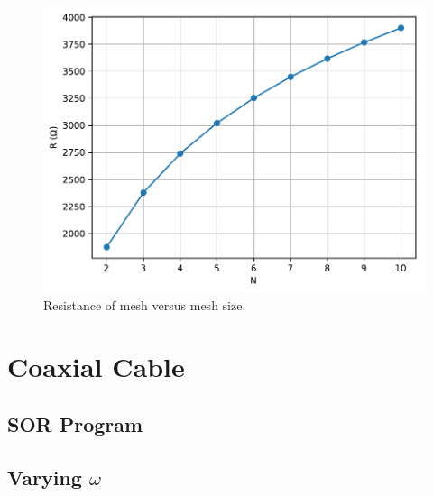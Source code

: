 \documentclass[a4paper,titlepage]{article}
\begin{document}
	\begin{figure}[!htb]
		\centering
		\includegraphics[width=\columnwidth]{plots/q2d.pdf}
		\caption
		{Resistance of mesh versus mesh size.}
		\label{fig:q2d}
	\end{figure}
	
	\section{Coaxial Cable}
	
	\subsection{SOR Program}
	
	\subsection{Varying $\omega$}
	
\end{document}
